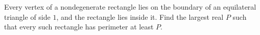 Every vertex of a nondegenerate rectangle lies on the boundary of an equilateral triangle of side $1$, and the rectangle lies inside it. Find the largest real $P$ such that every such rectangle has perimeter at least $P$.
